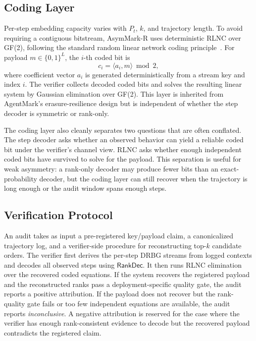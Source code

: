 \documentclass[conference,compsoc]{IEEEtran}
\newcommand{\ours}{AsymMark-R}
\newcommand{\RankDec}{\ensuremath{\mathsf{RankDec}}}
\begin{document}
\subsection{Coding Layer}

Per-step embedding capacity varies with $P_t$, $k$, and trajectory length. To avoid requiring a contiguous bitstream, \ours{} uses deterministic RLNC over GF(2), following the standard random linear network coding principle~\cite{ho2006random}. For payload $m\in\{0,1\}^L$, the $i$-th coded bit is
\begin{equation}
  c_i = \langle a_i, m\rangle \bmod 2,
\end{equation}
where coefficient vector $a_i$ is generated deterministically from a stream key and index $i$. The verifier collects decoded coded bits and solves the resulting linear system by Gaussian elimination over GF(2). This layer is inherited from AgentMark's erasure-resilience design but is independent of whether the step decoder is symmetric or rank-only.

The coding layer also cleanly separates two questions that are often conflated. The step decoder asks whether an observed behavior can yield a reliable coded bit under the verifier's channel view. RLNC asks whether enough independent coded bits have survived to solve for the payload. This separation is useful for weak asymmetry: a rank-only decoder may produce fewer bits than an exact-probability decoder, but the coding layer can still recover when the trajectory is long enough or the audit window spans enough steps.

\subsection{Verification Protocol}
\label{sec:verification-protocol}

An audit takes as input a pre-registered key/payload claim, a canonicalized trajectory log, and a verifier-side procedure for reconstructing top-$k$ candidate orders. The verifier first derives the per-step DRBG streams from logged contexts and decodes all observed steps using \RankDec{}. It then runs RLNC elimination over the recovered coded equations. If the system recovers the registered payload and the reconstructed ranks pass a deployment-specific quality gate, the audit reports a positive attribution. If the payload does not recover but the rank-quality gate fails or too few independent equations are available, the audit reports \emph{inconclusive}. A negative attribution is reserved for the case where the verifier has enough rank-consistent evidence to decode but the recovered payload contradicts the registered claim.
\end{document}
